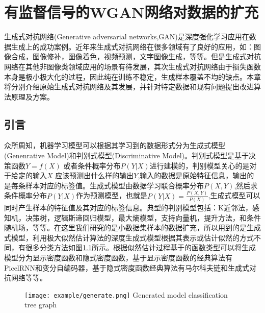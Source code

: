 \chapter{有监督信号的WGAN网络对数据的扩充}
生成式对抗网络(Generative adversarial networks,GAN)\cite{Goodfellow2017NIPS}是深度强化学习应用在数据生成上的成功案例。近年来生成式对抗网络在很多领域有了良好的应用，如：图像合成，图像修补，图像着色，视频预测，文字图像生成，等等。但是生成式对抗网络在其他非图像类领域应用的场景有待发展，其次生成式对抗网络由于损失函数本身是极小极大化的过程，因此纯在训练不稳定，生成样本覆盖不均的缺点。本章将分别介绍原始生成式对抗网络及其发展，并针对特定数据和现有问题提出改进算法原理及方案。
\section{引言}

众所周知，机器学习模型可以根据其学习到的数据形式分为生成式模型(Genenrative Model)和判别式模型(Discriminative Model)。判别式模型是基于决策函数$Y = f(X) $ 或者条件概率分布$ P(Y|X)$进行建模的，判别模型关心的是对于给定的输入$X$ 应该预测出什么样的输出$Y$,输入的数据是原始特征信息，输出的是每条样本对应的标签值。生成式模型由数据学习联合概率分布$P(X,Y)$,然后求条件概率分布$P(Y|X)$作为预测模型，也就是$P(Y|X) = \frac{{P(X,Y)}}{{P(X)}}$,生成式模型可以同时产生样本的特征值及其对应的标签信息\cite{Generative or discriminative? getting the best of both worlds}。典型的判别模型包括：K近邻法\cite{Hartigan1979Algorithm}，感知机，决策树，逻辑斯谛回归模型，最大熵模型，支持向量机，提升方法，和条件随机场，等等。在这里我们研究的是小数据集样本的数据扩充，所以用到的是生成式模型，利用极大似然估计算法的深度生成式模型根据其表示或估计似然的方式不同，有很多分类方法\cite{bibid}如图\ref{fig:生成式模型分类树状图}所示。根据似然估计过程基于的函数类型可以将生成模型分为显示密度函数和隐式密度函数，基于显示密度函数的经典算法有PicelRNN\cite{Oord2016Pixel}和变分自编码器\cite{Kingma2013Auto}，基于隐式密度函数经典算法有马尔科夫链和生成式对抗网络等等。

\begin{figure}[htpb]
	\centering
	\texttt{[image: example/generate.png]}
	{Generated model classification tree graph}
	\label{fig:生成式模型分类树状图}
\end{figure}

